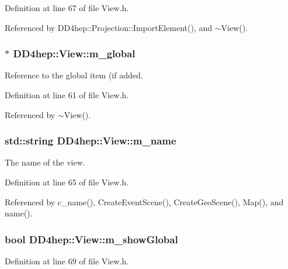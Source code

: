 Definition at line 67 of file View.h.

Referenced by DD4hep::Projection::ImportElement(), and $\sim$View().\hypertarget{class_d_d4hep_1_1_view_a6faa3880d28177952c6aad166327397a}{
\subsubsection[{m\_\-global}]{$\ast$ {\bf DD4hep::View::m\_\-global}}}
\label{class_d_d4hep_1_1_view_a6faa3880d28177952c6aad166327397a}


Reference to the global item (if added. 

Definition at line 61 of file View.h.

Referenced by $\sim$View().\hypertarget{class_d_d4hep_1_1_view_ac43b9e8f976a9731ff808cd6f7fc1ce7}{
\subsubsection[{m\_\-name}]{\setlength{\rightskip}{0pt plus 5cm}std::string {\bf DD4hep::View::m\_\-name}}}
\label{class_d_d4hep_1_1_view_ac43b9e8f976a9731ff808cd6f7fc1ce7}


The name of the view. 

Definition at line 65 of file View.h.

Referenced by c\_\-name(), CreateEventScene(), CreateGeoScene(), Map(), and name().\hypertarget{class_d_d4hep_1_1_view_ab3ae217421de575d8db2a4eed72b8629}{
\subsubsection[{m\_\-showGlobal}]{\setlength{\rightskip}{0pt plus 5cm}bool {\bf DD4hep::View::m\_\-showGlobal}}}
\label{class_d_d4hep_1_1_view_ab3ae217421de575d8db2a4eed72b8629}


Definition at line 69 of file View.h.

